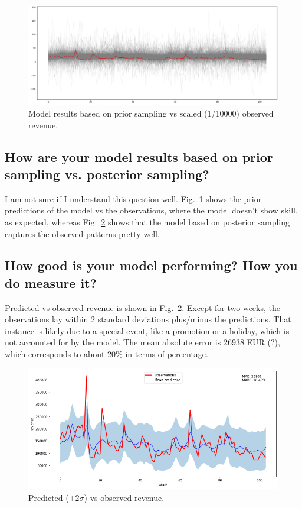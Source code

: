 \documentclass[a4paper,10pt]{scrartcl}
\begin{document}
 
\begin{figure}[!h]
  \centering
  \includegraphics[trim=0mm 0mm 0mm 0mm, clip, width=.8\textwidth]{Prior_prediction.png}
  \caption{Model results based on prior sampling vs scaled (1/10000) observed revenue.}\label{f:pred_prior}
\end{figure}

\FloatBarrier

\subsection {How are your model results based on prior sampling vs. posterior sampling?}
I am not sure if I understand this question well. Fig.~\ref{f:pred_prior} shows the prior predictions of the model vs the observations, where the model doesn't show skill, as expected, whereas Fig.~\ref{f:preds_vs_obs} shows that the model based on posterior sampling captures the observed patterns pretty well.

\subsection {How good is your model performing? How you do measure it?}

Predicted vs observed revenue is shown in Fig.~\ref{f:preds_vs_obs}. Except for two weeks, the observations lay within 2 standard deviations plus/minus the predictions. That instance is likely due to a special event, like a promotion or a holiday, which is not accounted for by the model. The mean absolute error is 26938 EUR (?), which corresponds to about 20\% in terms of percentage. 

\begin{figure}[!h]
  \centering
  \includegraphics[trim=0mm 0mm 0mm 0mm, clip, width=.8\textwidth]{preds_vs_obs.png}
  \caption{Predicted ($\pm 2\sigma$) vs observed revenue.}\label{f:preds_vs_obs}
\end{figure}
\end{document}
